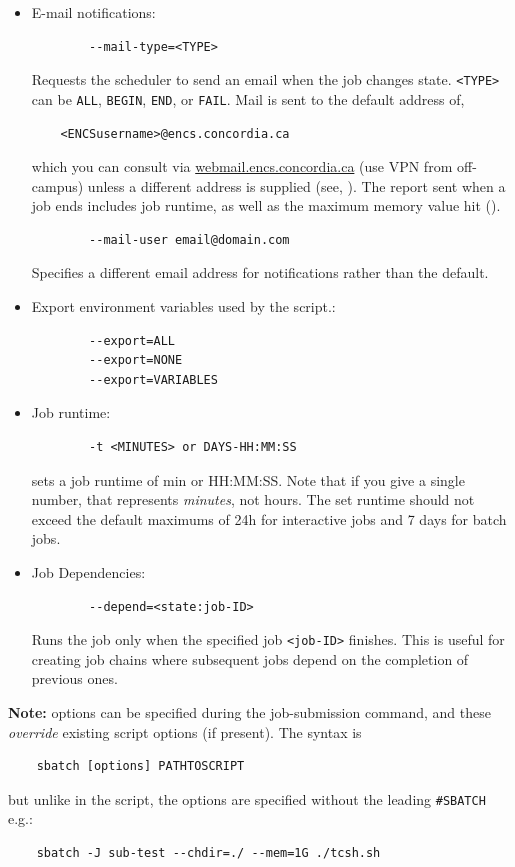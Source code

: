 \begin{itemize}
	\item E-mail notifications:
	\begin{verbatim}
		--mail-type=<TYPE>
	\end{verbatim}
	Requests the scheduler to send an email when the job changes state.
	\texttt{<TYPE>} can be \texttt{ALL}, \texttt{BEGIN}, \texttt{END}, or \texttt{FAIL}.
	Mail is sent to the default address of,
	\begin{verbatim}
	<ENCSusername>@encs.concordia.ca 
	\end{verbatim}
	which you can consult via \url{webmail.encs.concordia.ca} (use VPN from off-campus)
	unless a different address is supplied 
	(see, ).
	The report sent when a job ends includes job 
	runtime, as well as the maximum memory value hit (). 
	\begin{verbatim}
		--mail-user email@domain.com
	\end{verbatim}
	Specifies a different email address for notifications rather than the default.

	\item Export environment variables used by the script.:
	\begin{verbatim}
		--export=ALL
		--export=NONE
		--export=VARIABLES
	\end{verbatim}

	\item Job runtime:
	\begin{verbatim}
		-t <MINUTES> or DAYS-HH:MM:SS
	\end{verbatim} 
	sets a job runtime of min or HH:MM:SS. Note that if you give a single number,
	that represents \emph{minutes}, not hours. The set runtime should not exceed
	the default maximums of 24h for interactive jobs and 7 days for batch jobs.

	\item Job Dependencies:
	\begin{verbatim}
		--depend=<state:job-ID>
	\end{verbatim} 
	Runs the job only when the specified job \verb|<job-ID>| finishes. This is useful for creating job chains where 
	subsequent jobs depend on the completion of previous ones.
\end{itemize}

\noindent \textbf{Note:}  options can be specified during the job-submission 
command, and these \emph{override} existing script options (if present). The 
syntax is
\begin{verbatim}
	sbatch [options] PATHTOSCRIPT
\end{verbatim}
but unlike in the script, the options are specified without the leading \verb+#SBATCH+
e.g.: 
\begin{verbatim}
	sbatch -J sub-test --chdir=./ --mem=1G ./tcsh.sh
\end{verbatim}

